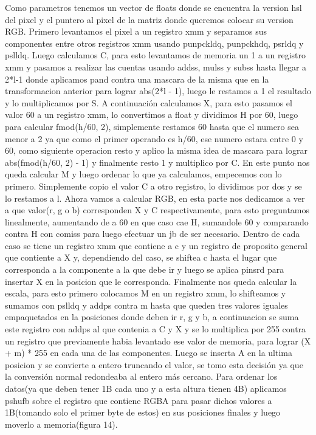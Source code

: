 \documentclass[a4paper]{article}
\begin{document}
Como parametros tenemos un vector de floats donde se encuentra la version hsl del pixel y el puntero al pixel de la matriz donde queremos colocar su version RGB. Primero levantamos el pixel a un registro xmm y separamos sus componentes entre otros registros xmm usando punpckldq, punpckhdq, psrldq y pslldq.
\newline
Luego calculamos C, para esto levantamos de memoria un 1 a un registro xmm y pasamos a realizar las cuentas usando addss, mulss y subss hasta llegar a 2*l-1 donde aplicamos pand contra una mascara de la misma que en la transformacion anterior para lograr abs(2*l - 1), luego le restamos a 1 el resultado y lo multiplicamos por S.
\newline
A continuación calculamos X, para esto pasamos el valor 60 a un registro xmm, lo convertimos a float y dividimos H por 60, luego para calcular fmod(h/60, 2), simplemente restamos 60 hasta que el numero sea menor a 2 ya que como el primer operando es h/60, ese numero estara entre 0 y 60, como siguiente operacion resto y aplico la misma idea de mascara para lograr abs(fmod(h/60, 2) - 1) y finalmente resto 1 y multiplico por C.
\newline
En este punto nos queda calcular M y luego ordenar lo que ya calculamos, empecemos con lo primero. Simplemente copio el valor C a otro registro, lo dividimos por dos y se lo restamos a l.
\newline
Ahora vamos a calcular RGB, en esta parte nos dedicamos a ver a que valor(r, g o b) corresponden X y C respectivamente, para esto preguntamos linealmente, aumentando de a 60 en que caso cae H, sumandole 60 y comparando contra H con comiss para luego efectuar un jb de ser necesario. Dentro de cada caso se tiene un registro xmm que contiene a c y un registro de proposito general que contiente a X y, dependiendo del caso, se shiftea c hasta el lugar que corresponda a la componente a la que debe ir y luego se aplica pinsrd para insertar X en la posicion que le corresponda.
\newline
Finalmente nos queda calcular la escala, para esto primero colocamos M en un registro xmm, lo shifteamos y sumamos con pslldq y addps contra m hasta que queden tres valores iguales empaquetados en la posiciones donde deben ir r, g y b, a continuacion se suma este registro con addps al que contenia a C y X y se lo multiplica por 255 contra un registro que previamente habia levantado ese valor de memoria, para lograr (X + m) * 255 en cada una de las componentes. Luego se inserta A en la ultima posicion y se convierte a entero truncando el valor, se tomo esta decisión ya que la conversión normal redondeaba al entero más cercano.
\newline
Para ordenar los datos(ya que deben tener 1B cada uno y a esta altura tienen 4B) aplicamos pshufb sobre el registro que contiene RGBA para pasar dichos valores a 1B(tomando solo el primer byte de estos) en sus posiciones finales y luego moverlo a memoria(figura 14).
\end{document}

